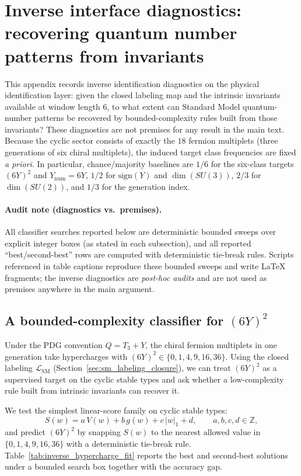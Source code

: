 \section{Inverse interface diagnostics: recovering quantum number patterns from invariants}
\label{app:inverse_quantum_numbers}

This appendix records inverse identification diagnostics on the physical identification layer: given the closed labeling map and the intrinsic invariants available at window length $6$, to what extent can Standard Model quantum-number patterns be recovered by bounded-complexity rules built from those invariants?
These diagnostics are not premises for any result in the main text.
Because the cyclic sector consists of exactly the $18$ fermion multiplets (three generations of six chiral multiplets), the induced target class frequencies are fixed \emph{a priori}.
In particular, chance/majority baselines are $1/6$ for the six-class targets $(6Y)^2$ and $Y_{\mathrm{num}}=6Y$, $1/2$ for $\mathrm{sign}(Y)$ and $\dim(SU(3))$, $2/3$ for $\dim(SU(2))$, and $1/3$ for the generation index.

\paragraph{Audit note (diagnostics vs.\ premises).}
All classifier searches reported below are deterministic bounded sweeps over explicit integer boxes (as stated in each subsection), and all reported ``best/second-best'' rows are computed with deterministic tie-break rules.
Scripts referenced in table captions reproduce these bounded sweeps and write \LaTeX{} fragments; the inverse diagnostics are \emph{post-hoc audits} and are not used as premises anywhere in the main argument.

\subsection{A bounded-complexity classifier for \texorpdfstring{$(6Y)^2$}{(6Y)2}}

Under the PDG convention $Q=T_3+Y$, the chiral fermion multiplets in one generation take hypercharges with $(6Y)^2\in\{0,1,4,9,16,36\}$.
Using the closed labeling $\mathcal{L}_{\mathrm{SM}}$ (Section~\ref{sec:sm_labeling_closure}), we can treat $(6Y)^2$ as a supervised target on the cyclic stable types and ask whether a low-complexity rule built from intrinsic invariants can recover it.

We test the simplest linear-score family on cyclic stable types:
\[
S(w)=a\,V(w)+b\,g(w)+c\,|w|_1+d,\qquad a,b,c,d\in\mathbb{Z},
\]
and predict $(6Y)^2$ by snapping $S(w)$ to the nearest allowed value in $\{0,1,4,9,16,36\}$ with a deterministic tie-break rule.
Table~\ref{tab:inverse_hypercharge_fit} reports the best and second-best solutions under a bounded search box together with the accuracy gap.

